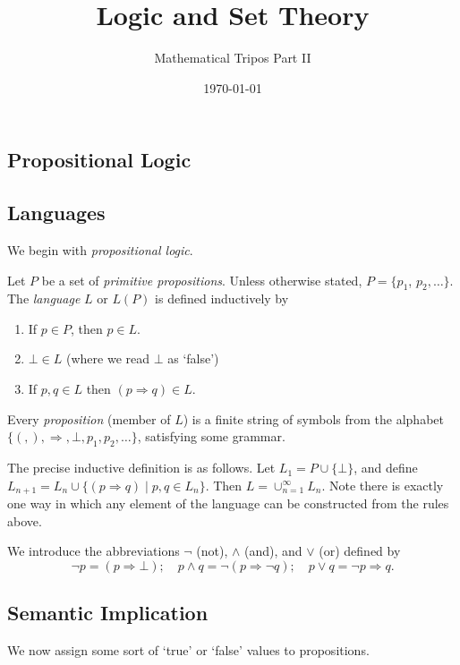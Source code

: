\documentclass[a3paper, 10pt]{article}
\title{Logic and Set Theory}
\author{Mathematical Tripos Part II}
\date{\today}
\renewcommand{\vocab}[1]{\emph{#1}}
\begin{document}
\begin{multicols*}{5}
\maketitle

\section{Propositional Logic}

\subsection{Languages}

We begin with \emph{propositional logic}.

\begin{definition}[Language]
  Let $P$ be a set of \vocab{primitive propositions}. Unless otherwise stated, $P = \{p_1$, $p_2, \dots\}$. The \vocab{language} $L$ or $L(P)$ is defined inductively by
  \begin{enumerate}
    \item If $p \in P$, then $p \in L$.
    \item $\bot \in L$ (where we read $\bot$ as `false')
    \item If $p, q \in L$ then $(p \Rightarrow q) \in L$.
  \end{enumerate}
\end{definition}

Every \vocab{proposition} (member of $L$) is a finite string of symbols from the alphabet $\{(,),\Rightarrow, \bot, p_1, p_2, \dots\}$, satisfying some grammar.

The precise inductive definition is as follows. Let $L_1 = P \cup \{\bot\}$, and define $L_{n + 1} = L_n \cup \{(p \Rightarrow q) \mid p, q \in L_n\}$. Then $L = \cup_{n = 1}^{\infty} L_n$.
Note there is exactly one way in which any element of the language can be constructed from the rules above.

We introduce the abbreviations $\lnot$ (not), $\land$ (and), and $\lor$ (or) defined by 
$$
\lnot p = (p \Rightarrow \bot); \quad p \land q = \lnot(p \Rightarrow \lnot q); \quad p \lor q = \lnot p \Rightarrow q.
$$

\subsection{Semantic Implication}

We now assign some sort of `true' or `false' values to propositions.


\end{multicols*}
\end{document}
